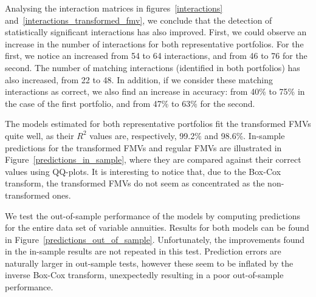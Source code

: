 Analysing the interaction matrices in figures~\ref{interactions} and~\ref{interactions_transformed_fmv}, we conclude that the detection of statistically significant interactions has also improved. First, we could observe an increase in the number of interactions for both representative portfolios. For the first, we notice an increased from 54 to 64 interactions, and from 46 to 76 for the second. The number of matching interactions (identified in both portfolios) has also increased, from 22 to 48. In addition, if we consider these matching interactions as correct, we also find an increase in accuracy: from 40\% to 75\% in the case of the first portfolio, and from 47\% to 63\% for the second.

The models estimated for both representative portfolios fit the transformed FMVs quite well, as their $R^2$ values are, respectively, 99.2\% and 98.6\%. In-sample predictions for the transformed FMVs and regular FMVs are illustrated in Figure~\ref{predictions_in_sample}, where they are compared against their correct values using QQ-plots. It is interesting to notice that, due to the Box-Cox transform, the transformed FMVs do not seem as concentrated as the non-transformed ones. 

We test the out-of-sample performance of the models by computing predictions for the entire data set of variable annuities. Results for both models can be found in Figure~\ref{predictions_out_of_sample}. Unfortunately, the improvements found in the in-sample results are not repeated in this test. Prediction errors are naturally larger in out-sample tests, however these seem to be inflated by the inverse Box-Cox transform, unexpectedly resulting in a poor out-of-sample performance. 

